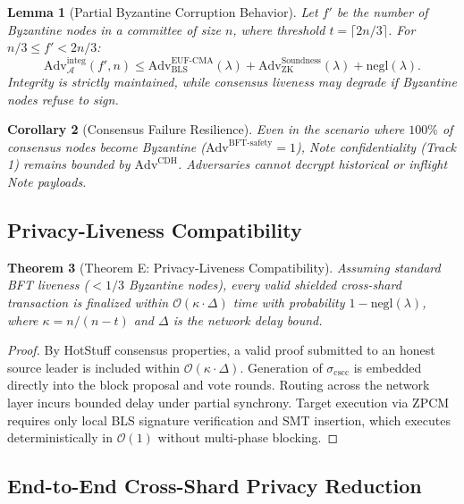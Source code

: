 \documentclass[journal,10pt,twocolumn]{IEEEtran}
\newtheorem{theorem}{Theorem}
\newtheorem{lemma}[theorem]{Lemma}
\newtheorem{corollary}[theorem]{Corollary}
\theoremstyle{definition}
\theoremstyle{remark}
\begin{document}
\begin{lemma}[Partial Byzantine Corruption Behavior]\label{lem:partial_bft}
Let $f'$ be the number of Byzantine nodes in a committee of size $n$, where threshold $t = \lceil 2n/3 \rceil$. For $n/3 \le f' < 2n/3$:
\begin{equation}
\text{Adv}^{\text{integ}}_{\mathcal{A}}(f', n) \le \text{Adv}^{\text{EUF-CMA}}_{\text{BLS}}(\lambda) + \text{Adv}^{\text{Soundness}}_{\text{ZK}}(\lambda) + \text{negl}(\lambda).
\end{equation}
Integrity is strictly maintained, while consensus liveness may degrade if Byzantine nodes refuse to sign.
\end{lemma}

\begin{corollary}[Consensus Failure Resilience]
Even in the scenario where $100\%$ of consensus nodes become Byzantine ($\text{Adv}^{\text{BFT-safety}} = 1$), Note confidentiality (Track 1) remains bounded by $\text{Adv}^{\text{CDH}}$. Adversaries cannot decrypt historical or inflight Note payloads.
\end{corollary}

\subsection{Privacy-Liveness Compatibility}

\begin{theorem}[Theorem E: Privacy-Liveness Compatibility]
Assuming standard BFT liveness ($< 1/3$ Byzantine nodes), every valid shielded cross-shard transaction is finalized within $\mathcal{O}(\kappa \cdot \Delta)$ time with probability $1 - \text{negl}(\lambda)$, where $\kappa = n / (n - t)$ and $\Delta$ is the network delay bound.
\end{theorem}

\begin{proof}
By HotStuff consensus properties, a valid proof submitted to an honest source leader is included within $\mathcal{O}(\kappa \cdot \Delta)$. Generation of $\sigma_{\text{cscc}}$ is embedded directly into the block proposal and vote rounds. Routing across the network layer incurs bounded delay under partial synchrony. Target execution via ZPCM requires only local BLS signature verification and SMT insertion, which executes deterministically in $\mathcal{O}(1)$ without multi-phase blocking.
\end{proof}

\subsection{End-to-End Cross-Shard Privacy Reduction}
\end{document}
